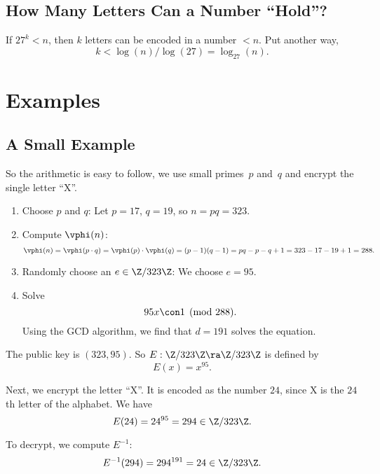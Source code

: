 \documentclass[11pt]{report}
\begin{document}
\subsection{How Many Letters Can a Number ``Hold''?}
If $27^k<n$, then $k$ letters can be encoded in a number $<n$.
Put another way,
$$
  k < \log(n) / \log(27) = \log_{27}(n).
$$

\section{Examples}
\subsection{A Small Example}
So the arithmetic is easy to follow, we use small primes~$p$
and~$q$ and encrypt the single letter ``X''.

\begin{enumerate}
  \item Choose $p$ and $q$: Let $p=17$, $q=19$, so $n=pq = 323$.
  \item Compute $\vphi(n)$:
        $$\vphi(n) = \vphi(p\cdot q)=\vphi(p)\cdot\vphi(q)
          = (p-1)(q-1) = pq-p-q+1 = 323-17-19+1 = 288.$$
  \item Randomly choose an $e\in\Z/323\Z$: We choose $e=95$.
  \item Solve
        $$
          95x \con 1\pmod{288}.
        $$
        Using the GCD algorithm, we find that $d=191$ solves
        the equation.
\end{enumerate}

The public key is $(323,95)$.  So $E:\Z/323\Z\ra \Z/323\Z$ is
defined by
$$
  E(x) = x^{95}.
$$

Next, we encrypt the letter ``X''.  It is encoded as the number
$24$, since X is the $24$th letter of the alphabet.
We have
$$
  E(24) = 24^{95} = 294 \in \Z/323\Z.
$$

To decrypt, we compute $E^{-1}$:
$$
  E^{-1}(294) = 294^{191} = 24 \in \Z/323\Z.
$$
\end{document}
